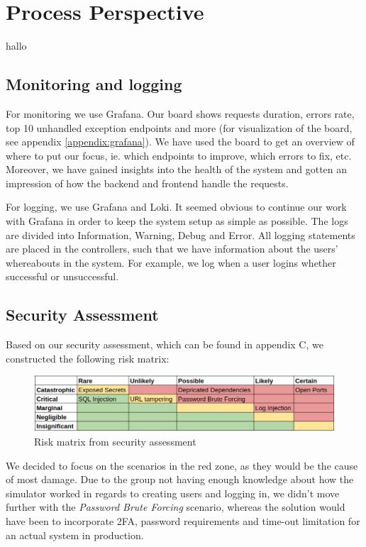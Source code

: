 \section{Process Perspective}
hallo \cite{devopshandbook}
\subsection{Monitoring and logging}
For monitoring we use Grafana. Our board shows requests duration, errors rate, top 10 unhandled exception endpoints and more (for visualization of the board, see appendix \ref{appendix:grafana}). We have used the board to get an overview of where to put our focus, ie. which endpoints to improve, which errors to fix, etc. Moreover, we have gained insights into the health of the system and gotten an impression of how the backend and frontend handle the requests.

For logging, we use Grafana and Loki. It seemed obvious to continue our work with Grafana in order to keep the system setup as simple as possible. The logs are divided into Information, Warning, Debug and Error. All logging statements are placed in the controllers, such that we have information about the users' whereabouts in the system. For example, we log when a user logins whether successful or unsuccessful.
\subsection{Security Assessment}
Based on our security assessment, which can be found in appendix C, we constructed the following risk matrix:
\begin{figure}[H]
    \centering
    \includegraphics[width=0.7\linewidth]{images/risk-matrix.png}
    \caption{Risk matrix from security assessment}
    \label{fig:enter-label}
\end{figure}
We decided to focus on the scenarios in the red zone, as they would be the cause of most damage. Due to the group not having enough knowledge about how the simulator worked in regards to creating users and logging in, we didn't move further with the \textit{Password Brute Forcing} scenario, whereas the solution would have been to incorporate 2FA, password requirements and time-out limitation for an actual system in production.

